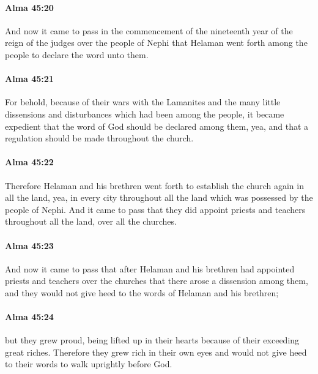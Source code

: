 		\paragraph{Alma 45:20} %
			\label{ALMA-45-20}

			And now it came to pass in the commencement of the nineteenth year
			of the reign of the judges over the people of Nephi
			that Helaman went forth among the people to declare the word unto them.

		\paragraph{Alma 45:21} %
			\label{ALMA-45-21}

			For behold, because of their wars with the Lamanites
			and the many little dissensions and disturbances
			which had been among the people,
			it became expedient that the word of God should be declared among them,
			yea, and that a regulation should be made throughout the church.

		\paragraph{Alma 45:22} %
			\label{ALMA-45-22}

			Therefore Helaman and his brethren went forth
			to establish the church again in all the land,
			yea, in every city throughout all the land
			which was possessed by the people of Nephi.
			And it came to pass that they did appoint priests and teachers
			throughout all the land, over all the churches.

		\paragraph{Alma 45:23} %
			\label{ALMA-45-23}

			And now it came to pass that after Helaman and his brethren
			had appointed priests and teachers over the churches
			that there arose a dissension among them,
			and they would not give heed to the words of Helaman and his brethren;

		\paragraph{Alma 45:24} %
			\label{ALMA-45-24}

			but they grew proud,
			being lifted up in their hearts because of their exceeding great riches.
			Therefore they grew rich in their own eyes
			and would not give heed to their words to walk uprightly before God.

